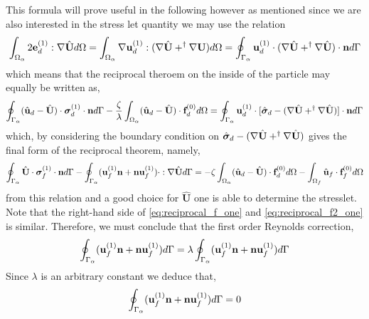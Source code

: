 This formula will prove useful in the following however as mentioned since we are also interested in the stress let quantity we may use the relation 
\begin{align*}
    \int_{\Omega_{\alpha}}  2\textbf{e}_d^{(1)} : \mathbf{\nabla} \hat{\textbf{U}}  d\Omega
    &=\int_{\Omega_{\alpha}}  \mathbf{\nabla} \textbf{u}_d^{(1)} : (\mathbf{\nabla} \hat{\textbf{U}} +^\dagger \mathbf{\nabla} \textbf{U})  d\Omega
    =
    \oint_{\Gamma_{\alpha}}   \textbf{u}_d^{(1)} \cdot (\mathbf{\nabla} \hat{\textbf{U}} + ^\dagger\mathbf{\nabla} \hat{\textbf{U}})  \cdot \textbf{n} d\Gamma\\
\end{align*}
which means that the reciprocal theroem on the inside of the particle may equally be written as, 
\begin{equation*}
    \oint_{\Gamma_{\alpha}}  (\hat{\textbf{u}}_d - \hat{\textbf{U}})\cdot \bm\sigma_d^{(1)} \cdot \textbf{n} d\Gamma
    - \frac{\zeta}{\lambda} \int_{\Omega_{\alpha}} (\hat{\textbf{u}}_d - \hat{\textbf{U}}) \cdot \textbf{f}_d^{(0)} d\Omega
    =
    \oint_{\Gamma_{\alpha}} 
         \textbf{u}_d^{(1)}\cdot[\hat{\bm\sigma}_d  - (\mathbf{\nabla} \hat{\textbf{U}} + ^\dagger\mathbf{\nabla} \hat{\textbf{U}})]\cdot \textbf{n}
     d\Gamma
\end{equation*}
which, by considering the boundary condition on $\hat{\bm\sigma}_d  - (\mathbf{\nabla} \hat{\textbf{U}} + ^\dagger\mathbf{\nabla} \hat{\textbf{U}})$ gives the final form of the reciprocal theorem, namely, 
\begin{equation*}
    \intS{\hat{\textbf{U}}\cdot  \bm\sigma_f^{(1)} \cdot \textbf{n}}
    - \intS{(\textbf{u}_f^{(1)} \textbf{n} + \textbf{n} \textbf{u}_f^{(1)})\cdot :\grad \hat{\textbf{U}} }
    = 
    - \zeta \intO{(\hat{\textbf{u}}_d - \hat{\textbf{U}}) \cdot \textbf{f}_d^{(0)}}
    - \intOf{\hat{\textbf{u}}_f\cdot  \textbf{f}^{(0)}_f}
    \label{eq:reciprocal_f2_one}
\end{equation*}
from this relation and a good choice for $\hat{\textbf{U}}$ one is able to determine the stresslet. 
Note that the right-hand side of \ref{eq:reciprocal_f_one} and \ref{eq:reciprocal_f2_one} is similar. 
Therefore, we must conclude that the first order Reynolds correction,
\begin{equation*}
    \oint_{\Gamma_{\alpha}} (\textbf{u}_f^{(1)} \textbf{n} + \textbf{n} \textbf{u}_f^{(1)}) d\Gamma
    = \lambda \oint_{\Gamma_{\alpha}} (\textbf{u}_f^{(1)} \textbf{n} + \textbf{n} \textbf{u}_f^{(1)}) d\Gamma
\end{equation*}
Since $\lambda$ is an arbitrary constant we deduce that, 
\begin{equation*}
    \oint_{\Gamma_{\alpha}} (\textbf{u}_f^{(1)} \textbf{n} + \textbf{n} \textbf{u}_f^{(1)}) d\Gamma= 0
\end{equation*}

